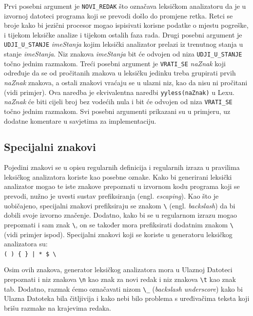 \documentclass[times, 12pt, utf8]{book}
\begin{document}
Prvi posebni argument je \verb|NOVI_REDAK| što označava leksičkom analizatoru da je u izvornoj datoteci programa koji se prevodi došlo do promjene retka.
Retci se broje kako bi jezični procesor mogao ispisivati korisne podatke o mjestu pogreške, i tijekom leksičke analize i tijekom ostalih faza rada.
Drugi posebni argument je \verb|UDJI_U_STANJE| \emph{imeStanja} kojim leksički analizator prelazi iz trenutnog stanja u stanje \emph{imeStanja}.
Niz znakova \emph{imeStanja} bit će odvojen od niza \verb|UDJI_U_STANJE| točno jednim razmakom.
Treći posebni argument je \verb|VRATI_SE| \emph{naZnak} koji određuje da se od pročitanih znakova u leksičku jedinku treba grupirati prvih \emph{naZnak} znakova, a ostali znakovi vraćaju se u ulazni niz, kao da nisu ni pročitani (vidi primjer).
Ova naredba je ekvivalentna naredbi \verb|yyless(naZnak)| u Lexu.
\emph{naZnak} će biti cijeli broj bez vodećih nula i bit će odvojen od niza \verb|VRATI_SE| točno jednim razmakom.
Svi posebni argumenti prikazani su u primjeru, uz dodatne komentare u savjetima za implementaciju.

\subsection{Specijalni znakovi}\label{sec:specijalni_znakovi}
Pojedini znakovi se u opisu regularnih definicija i regularnih izraza u pravilima leksičkog analizatora koriste kao posebne oznake.
Kako bi generirani leksički analizator mogao te iste znakove prepoznati u izvornom kodu programa koji se prevodi, nužno je uvesti sustav prefiksiranja (engl. \emph{escaping}).
Kao što je uobičajeno, specijalni znakovi prefiksiraju se znakom \verb|\| (engl. \emph{backslash}) da bi dobili svoje izvorno značenje.
Dodatno, kako bi se u regularnom izrazu mogao prepoznati i sam znak \verb|\|, on se također mora prefiksirati dodatnim znakom \verb|\| (vidi primjer ispod).
Specijalni znakovi koji se koriste u generatoru leksičkog analizatora su:\\
\verb=( ) { } | * $ \=

Osim ovih znakova, generator leksičkog analizatora mora u Ulaznoj Datoteci prepoznati i niz znakova \verb|\n| kao znak za novi redak i niz znakova \verb|\t| kao znak tab.
Dodatno, razmak ćemo označavati nizom \verb|\_| (\emph{backslash underscore}) kako bi Ulazna Datoteka bila čitljivija i kako nebi bilo problema s uređivačima teksta koji brišu razmake na krajevima redaka.
\end{document}
